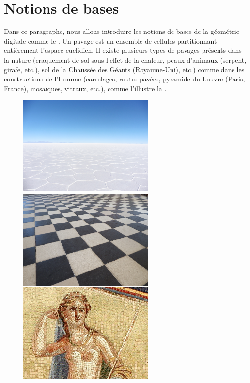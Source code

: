 \section{Notions de bases}
\label{sec:notions-base}
%
Dans ce paragraphe, nous allons introduire les notions de bases de la géométrie
digitale comme le . Un pavage est un ensemble de cellules
partitionnant entièrement l'espace euclidien. Il existe plusieurs types de
pavages présents dans la nature (craquement de sol sous l'effet de la chaleur,
peaux d'animaux (serpent, girafe, etc.), sol de la Chaussée des Géants
(Royaume-Uni), etc.) comme dans les constructions de l'Homme (carrelages, routes
pavées, pyramide du Louvre (Paris, France), mosaïques, vitraux, etc.), comme
l'illustre la .


\begin{figure}[ht]
  \begin{center}
    \includegraphics[width=6.8cm]{images/Notions/pavage_mer_de_sel}
    \includegraphics[width=6.8cm]{images/Notions/pavage_chateau}\\
    \includegraphics[width=6.8cm]{images/Notions/pavage_mosaique}

\end{center}
\end{figure}
